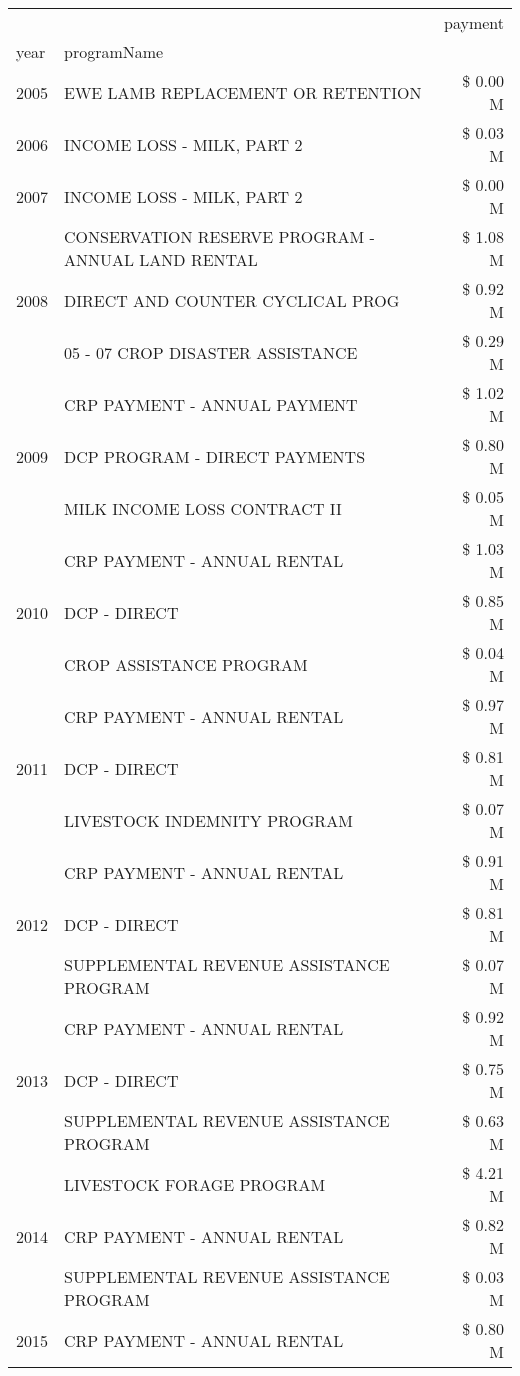 \begin{tabular}{llr}
\toprule
 &  & payment \\
year & programName &  \\
\midrule
2005 & EWE LAMB REPLACEMENT OR RETENTION & \$ 0.00 M \\
\cline{1-3}
2006 & INCOME LOSS - MILK, PART 2 & \$ 0.03 M \\
\cline{1-3}
2007 & INCOME LOSS - MILK, PART 2 & \$ 0.00 M \\
\cline{1-3}
\multirow[t]{3}{*}{2008} & CONSERVATION RESERVE PROGRAM - ANNUAL LAND RENTAL & \$ 1.08 M \\
 & DIRECT AND COUNTER CYCLICAL PROG & \$ 0.92 M \\
 & 05 - 07 CROP DISASTER ASSISTANCE & \$ 0.29 M \\
\cline{1-3}
\multirow[t]{3}{*}{2009} & CRP PAYMENT - ANNUAL PAYMENT & \$ 1.02 M \\
 & DCP PROGRAM - DIRECT PAYMENTS & \$ 0.80 M \\
 & MILK INCOME LOSS CONTRACT II & \$ 0.05 M \\
\cline{1-3}
\multirow[t]{3}{*}{2010} & CRP PAYMENT - ANNUAL RENTAL & \$ 1.03 M \\
 & DCP - DIRECT & \$ 0.85 M \\
 & CROP ASSISTANCE PROGRAM & \$ 0.04 M \\
\cline{1-3}
\multirow[t]{3}{*}{2011} & CRP PAYMENT - ANNUAL RENTAL & \$ 0.97 M \\
 & DCP - DIRECT & \$ 0.81 M \\
 & LIVESTOCK INDEMNITY PROGRAM & \$ 0.07 M \\
\cline{1-3}
\multirow[t]{3}{*}{2012} & CRP PAYMENT - ANNUAL RENTAL & \$ 0.91 M \\
 & DCP - DIRECT & \$ 0.81 M \\
 & SUPPLEMENTAL REVENUE ASSISTANCE PROGRAM & \$ 0.07 M \\
\cline{1-3}
\multirow[t]{3}{*}{2013} & CRP PAYMENT - ANNUAL RENTAL & \$ 0.92 M \\
 & DCP - DIRECT & \$ 0.75 M \\
 & SUPPLEMENTAL REVENUE ASSISTANCE PROGRAM & \$ 0.63 M \\
\cline{1-3}
\multirow[t]{3}{*}{2014} & LIVESTOCK FORAGE PROGRAM & \$ 4.21 M \\
 & CRP PAYMENT - ANNUAL RENTAL & \$ 0.82 M \\
 & SUPPLEMENTAL REVENUE ASSISTANCE PROGRAM & \$ 0.03 M \\
\cline{1-3}
\multirow[t]{3}{*}{2015} & CRP PAYMENT - ANNUAL RENTAL & \$ 0.80 M \\

\end{tabular}
